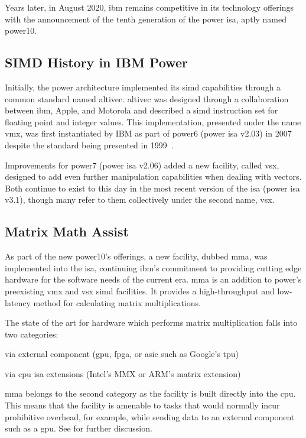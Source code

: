 \documentclass[\main/thesis.tex]{subfiles}
\begin{document}
Years later, in August 2020, \gls{ibm} remains competitive in its technology offerings with the announcement of the tenth generation of the \gls{power} \gls{isa}, aptly named \gls{power10}.

\subsection{SIMD History in IBM Power}
Initially, the \gls{power} architecture implemented its \gls{simd} capabilities through a common standard named \gls{altivec}.
\Gls{altivec} was designed through a collaboration between \gls{ibm}, Apple, and Motorola and described a \gls{simd} instruction set for floating point and integer values.
This implementation, presented under the name \gls{vmx}, was first instantiated by IBM as part of \gls{power}6 (\gls{power} \gls{isa} v2.03) in 2007 despite the standard being presented in 1999~\autocite{tyler1999altivec}.

Improvements for \gls{power}7 (\gls{power} \gls{isa} v2.06) added a new facility, called \gls{vsx}, designed to add even further manipulation capabilities when dealing with vectors.
Both continue to exist to this day in the most recent version of the \gls{isa} (\gls{power} \gls{isa} v3.1), though many refer to them collectively under the second name, \gls{vsx}.

\subsection{Matrix Math Assist}
\label{sec:mmaintro}
As part of the new \gls{power10}'s offerings, a new facility, dubbed \gls{mma}, was implemented into the \gls{isa}, continuing \gls{ibm}'s commitment to providing cutting edge hardware for the software needs of the current era.
\gls{mma} is an addition to \gls{power}'s preexisting \gls{vmx} and \gls{vsx} \gls{simd} facilities.
It provides a high-throughput and low-latency method for calculating matrix multiplications.

The state of the art for hardware which performs matrix multiplication falls into two categories:
\begin{enumerate*}[itemjoin*={{ and }}, label=\textbf{(\arabic*)}, after={.}]
  \item via external component (\eg \gls{gpu}, \gls{fpga}, or \gls{asic} such as Google's \gls{tpu})
  \item via \gls{cpu} \gls{isa} extensions (\eg Intel's MMX or ARM's matrix extension)
\end{enumerate*}
\Gls{mma} belongs to the second category as the facility is built directly into the \gls{cpu}.
This means that the facility is amenable to tasks that would normally incur prohibitive overhead, for example, while sending data to an external component such as a \gls{gpu}.
See  for further discussion.
\end{document}

